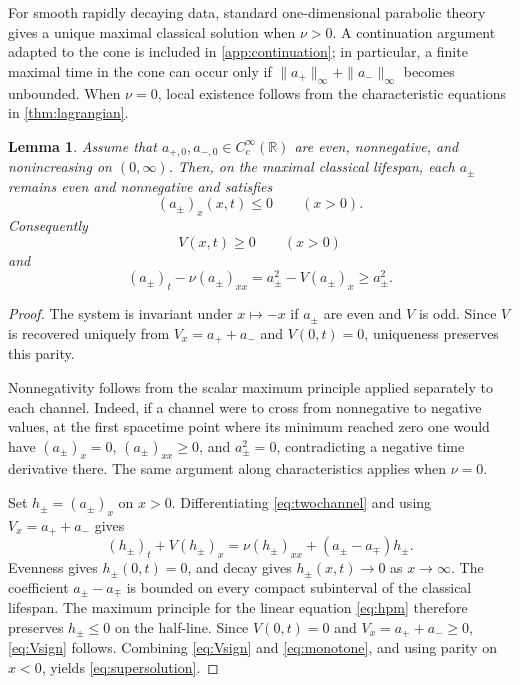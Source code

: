\documentclass[11pt]{article}
\newtheorem{lemma}[theorem]{Lemma}
\theoremstyle{definition}
\newcommand{\R}{\mathbb R}
\begin{document}
For smooth rapidly decaying data, standard one-dimensional parabolic theory gives a unique maximal classical solution when $\nu>0$.  A continuation argument adapted to the cone is included in \cref{app:continuation}; in particular, a finite maximal time in the cone can occur only if $\|a_+\|_\infty+\|a_-\|_\infty$ becomes unbounded.  When $\nu=0$, local existence follows from the characteristic equations in \cref{thm:lagrangian}.

\begin{lemma}\label{lem:cone}
Assume that $a_{+,0},a_{-,0}\in C_c^\infty(\R)$ are even, nonnegative, and nonincreasing on $(0,\infty)$.  Then, on the maximal classical lifespan, each $a_\pm$ remains even and nonnegative and satisfies
\begin{equation}\label{eq:monotone}
 (a_\pm)_x(x,t)\le0\qquad(x>0).
\end{equation}
Consequently
\begin{equation}\label{eq:Vsign}
 V(x,t)\ge0\qquad(x>0)
\end{equation}
and
\begin{equation}\label{eq:supersolution}
 (a_\pm)_t-\nu(a_\pm)_{xx}
 =a_\pm^2-V(a_\pm)_x
 \ge a_\pm^2.
\end{equation}
\end{lemma}

\begin{proof}
The system is invariant under $x\mapsto-x$ if $a_\pm$ are even and $V$ is odd.  Since $V$ is recovered uniquely from $V_x=a_++a_-$ and $V(0,t)=0$, uniqueness preserves this parity.

Nonnegativity follows from the scalar maximum principle applied separately to each channel.  Indeed, if a channel were to cross from nonnegative to negative values, at the first spacetime point where its minimum reached zero one would have $(a_\pm)_x=0$, $(a_\pm)_{xx}\ge0$, and $a_\pm^2=0$, contradicting a negative time derivative there.  The same argument along characteristics applies when $\nu=0$.

Set $h_\pm=(a_\pm)_x$ on $x>0$.  Differentiating \eqref{eq:twochannel} and using $V_x=a_++a_-$ gives
\begin{equation}\label{eq:hpm}
 (h_\pm)_t+V(h_\pm)_x
 =\nu(h_\pm)_{xx}+(a_\pm-a_\mp)h_\pm.
\end{equation}
Evenness gives $h_\pm(0,t)=0$, and decay gives $h_\pm(x,t)\to0$ as $x\to\infty$.  The coefficient $a_\pm-a_\mp$ is bounded on every compact subinterval of the classical lifespan.  The maximum principle for the linear equation \eqref{eq:hpm} therefore preserves $h_\pm\le0$ on the half-line.  Since $V(0,t)=0$ and $V_x=a_++a_-\ge0$, \eqref{eq:Vsign} follows.  Combining \eqref{eq:Vsign} and \eqref{eq:monotone}, and using parity on $x<0$, yields \eqref{eq:supersolution}.
\end{proof}
\end{document}
